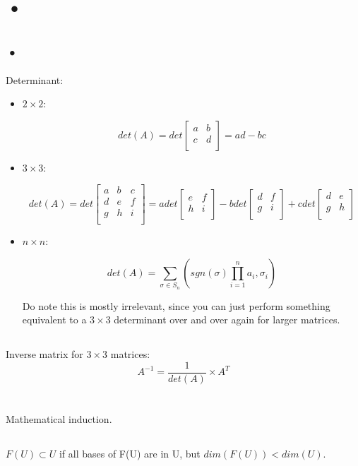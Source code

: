 \documentclass{report}
\begin{document}
\section{•}

\subsection{•}
Determinant:
\begin{itemize}
\item$2\times2$:

$$det(A)=det\begin{bmatrix}a&b\\c&d\\\end{bmatrix}=ad-bc$$
\item$3\times3$:

$$det(A)=det\begin{bmatrix}a&b&c\\d&e&f\\g&h&i\\\end{bmatrix}=adet\begin{bmatrix}e&f\\h&i\\\end{bmatrix}-bdet\begin{bmatrix}d&f\\g&i\\\end{bmatrix}+cdet\begin{bmatrix}d&e\\g&h\\\end{bmatrix}$$

\item$n\times n$:

$$det(A)=\sum_{\sigma\in S_n}(sgn(\sigma)\prod_{i=1}^{n}a_i,\sigma_i )$$

Do note this is mostly irrelevant, since you can just perform something equivalent to a $3\times3$ determinant over and over again for larger matrices.
\end{itemize}

\subsection{}
Inverse matrix for $3\times3$ matrices:
$$A^{-1}=\frac{1}{det(A)}\times A^T$$

\section{}

\subsection{}
Mathematical induction.

\subsection{}

$F(U)\subset U$ if all bases of F(U) are in U, but $dim(F(U))< dim(U)$.
\end{document}
